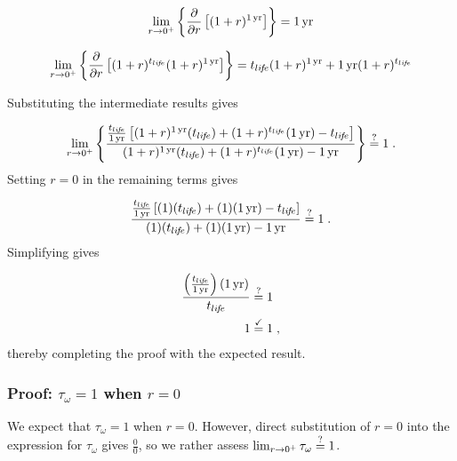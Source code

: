 \begin{equation}
  \lim_{r \to 0^+} \left\{\frac{\partial}{\partial r} \left[ (1 + r)^{1\,\mathrm{yr}} \right] \right\} = 1\,\mathrm{yr}
\end{equation}

\begin{equation}
  \lim_{r \to 0^+} \left\{\frac{\partial}{\partial r} \left[ (1 + r)^{t_{li\!f\!e}} (1 + r)^{1\,\mathrm{yr}} \right] \right\} = t_{li\!f\!e} (1 + r)^{1\,\mathrm{yr}}  + 1\,\mathrm{yr} (1 + r)^{t_{li\!f\!e}} 
\end{equation}

Substituting the intermediate results gives

\begin{equation}
  \lim_{r \to 0^+} \left\{
                         \frac{\frac{\tlife}{\oneyr}
                         \left[ (1 + r)^{\oneyr} (\tlife) + 
                         (1 + r)^{\tlife} (\oneyr) - 
                         \tlife \right]}
                        {(1 + r)^{\oneyr} (\tlife) + 
                         (1 + r)^{\tlife} (\oneyr) - 
                         \oneyr}
                    \right\} \questionequal 1 \; .
\end{equation}
%
Setting $r = 0$ in the remaining terms gives

\begin{equation}
  \frac{\frac{\tlife}{\oneyr}
              \left[ (1) (\tlife) + 
                     (1) (\oneyr) - 
                     \tlife
              \right]}
       {(1) (\tlife) + 
        (1) (\oneyr) - 
        \oneyr} \questionequal 1 \; .
\end{equation}
%
Simplifying gives

\begin{align}
  \frac{\left( \frac{t_{li\!f\!e}}{1\,\mathrm{yr}} \right) (1\,\mathrm{yr})}{t_{li\!f\!e}} &\stackrel{?}{=} 1 \\
  1 &\stackrel{\checkmark}{=} 1 \; ,
\end{align}
%
thereby completing the proof with the expected result. 



\subsubsection{Proof: $\tau_\omega = 1$ when $r = 0$}
\label{sec:proof_R_omega}

We expect that $\tau_\omega = 1$ when $r = 0$.
However, direct substitution of $r = 0$ into the expression
for $\tau_\omega$ gives $\frac{0}{0}$, 
so we rather assess
$\lim_{r \to 0^+} \tau_\omega \stackrel{?}{=} 1$.


